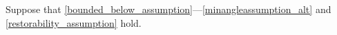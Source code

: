 Suppose that \cref{bounded_below_assumption}---\cref{minangleassumption_alt} and \cref{restorability_assumption} hold.
